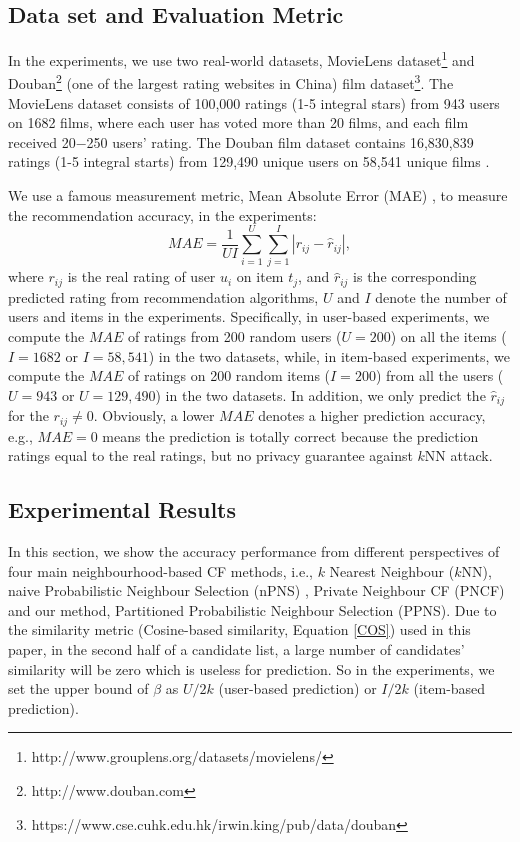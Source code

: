 \documentclass[11pt]{article}
\begin{document}
\subsection{Data set and Evaluation Metric}
In the experiments, we use two real-world datasets, MovieLens dataset\footnote{http://www.grouplens.org/datasets/movielens/} and Douban\footnote{http://www.douban.com} (one of the largest rating websites in China) film dataset\footnote{https://www.cse.cuhk.edu.hk/irwin.king/pub/data/douban}. The MovieLens dataset consists of 100,000 ratings (1-5 integral stars) from 943 users on 1682 films, where each user has voted more than 20 films, and each film received 20$-$250 users' rating. The Douban film dataset contains 16,830,839 ratings (1-5 integral starts) from 129,490 unique users on 58,541 unique films \cite{MA2011}.

We use a famous measurement metric, Mean Absolute Error (MAE) \cite{WILLMOTT2005, ZHU2014}, to measure the recommendation accuracy, in the experiments:
\begin{equation}
\label{MAE}
MAE=\frac{1}{UI}\sum_{i=1}^{U}{\sum_{j=1}^{I}{|r_{ij}-\hat{r}_{ij}|}},
\end{equation}
where $r_{ij}$ is the real rating of user $u_i$ on item $t_j$, and $\hat{r}_{ij}$ is the corresponding predicted rating from recommendation algorithms, $U$ and $I$ denote the number of users and items in the experiments. Specifically, in user-based experiments, we compute the $MAE$ of ratings from 200 random users ($U=200$) on all the items ($I=1682$ or $I=58,541$) in the two datasets, while, in item-based experiments, we compute the $MAE$ of ratings on 200 random items ($I=200$) from all the users ($U=943$ or $U=129,490$) in the two datasets. In addition, we only predict the $\hat{r}_{ij}$ for the $r_{ij} \neq 0$. Obviously, a lower $MAE$ denotes a higher prediction accuracy, e.g., $MAE=0$ means the prediction is totally correct because the prediction ratings equal to the real ratings, but no privacy guarantee against $k$NN attack.


\subsection{Experimental Results}
In this section, we show the accuracy performance from different perspectives of four main neighbourhood-based CF methods, i.e., $k$ Nearest Neighbour ($k$NN), naive Probabilistic Neighbour Selection (nPNS) \cite{ADAMOPOULOS2014}, Private Neighbour CF (PNCF) \cite{ZHU2014} and our method, Partitioned Probabilistic Neighbour Selection (PPNS). Due to the similarity metric (Cosine-based similarity, Equation \eqref{COS}) used in this paper, in the second half of a candidate list, a large number of candidates' similarity will be zero which is useless for prediction. So in the experiments, we set the upper bound of $\beta$ as $U/2k$ (user-based prediction) or $I/2k$ (item-based prediction).
\end{document}
